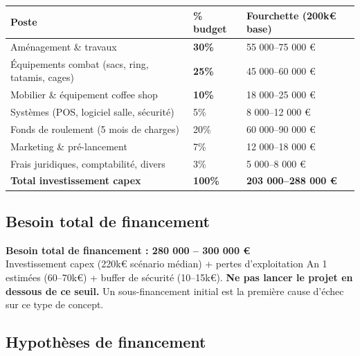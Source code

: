 \documentclass[11pt, a4paper]{article}
\newcommand{\redcell}[1]{\textcolor{fc-red}{\textbf{#1}}}
\newcommand{\goldcell}[1]{\textcolor{fc-gold}{\textbf{#1}}}
\begin{document}
\begin{center}
\begin{tabular}{@{}p{6.5cm}p{2cm}p{4cm}@{}}
\toprule
\rowcolor{fc-ink}\color{white}\textbf{Poste} & \color{white}\textbf{\% budget} & \color{white}\textbf{Fourchette (200k€ base)} \\
\midrule
Aménagement \& travaux & \redcell{30\%} & 55 000–75 000 € \\
\rowcolor{fc-bg2} Équipements combat (sacs, ring, tatamis, cages) & \redcell{25\%} & 45 000–60 000 € \\
Mobilier \& équipement coffee shop & \goldcell{10\%} & 18 000–25 000 € \\
\rowcolor{fc-bg2} Systèmes (POS, logiciel salle, sécurité) & 5\% & 8 000–12 000 € \\
Fonds de roulement (5 mois de charges) & 20\% & 60 000–90 000 € \\
\rowcolor{fc-bg2} Marketing \& pré-lancement & 7\% & 12 000–18 000 € \\
Frais juridiques, comptabilité, divers & 3\% & 5 000–8 000 € \\
\midrule
\textbf{Total investissement capex} & \textbf{100\%} & \textbf{203 000–288 000 €} \\
\bottomrule
\end{tabular}
\end{center}

\subsection{Besoin total de financement}

\begin{warnbox}
\textbf{Besoin total de financement : 280 000 – 300 000 €}\\
Investissement capex (220k€ scénario médian) + pertes d'exploitation An 1 estimées (60–70k€) + buffer de sécurité (10–15k€). \textbf{Ne pas lancer le projet en dessous de ce seuil.} Un sous-financement initial est la première cause d'échec sur ce type de concept.
\end{warnbox}

\subsection{Hypothèses de financement}
\end{document}
